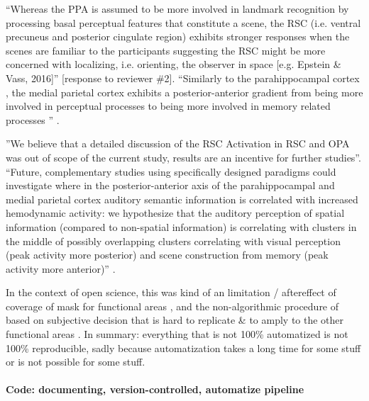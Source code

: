%
``Whereas the PPA is assumed to be more involved in landmark recognition by
processing basal perceptual features that constitute a scene, the RSC (i.e.
ventral precuneus and posterior cingulate region) exhibits stronger responses
when the scenes are familiar to the participants suggesting the RSC might be
more concerned with localizing, i.e. orienting, the observer in space [e.g.
Epstein \& Vass, 2016]'' [response to reviewer \#2].
``Similarly to the parahippocampal cortex \citep{aminoff2013role}, the medial
parietal cortex exhibits a posterior-anterior gradient from being more involved
in perceptual processes to being more involved in memory related processes
\citep{chrastil2018heterogeneity, hassabis2009construction, silson2019posterior,
steel2021network}'' \citep{haeusler2022processing}.

%
''We believe that a detailed discussion of the RSC Activation in RSC and OPA was
out of scope of the current study, results are an incentive for further
studies''.
``Future, complementary studies using specifically designed paradigms could
investigate where in the posterior-anterior axis of the parahippocampal and
medial parietal cortex auditory semantic information is correlated with
increased hemodynamic activity:
we hypothesize that the auditory perception of spatial information (compared to
non-spatial information) is correlating with clusters in the middle of possibly
overlapping clusters correlating with visual perception (peak activity more
posterior) and scene construction from memory (peak activity more anterior)''
\citep{haeusler2022processing}.

%
In the context of open science, this was kind of an limitation / aftereffect of
coverage of mask for functional areas \citet{sengupta2016extension}, and the
non-algorithmic procedure of \citet{sengupta2016extension} based on subjective
decision that is hard to replicate \& to amply to the other functional areas
\citep[cf. algorithmic procedure in, e.g.,][]{julian2012algorithmic}.
%
In summary: everything that is not 100\% automatized is not 100\% reproducible,
sadly because automatization takes a long time for some stuff or is not possible
for some stuff.


\paragraph{Code: documenting, version-controlled, automatize pipeline}

